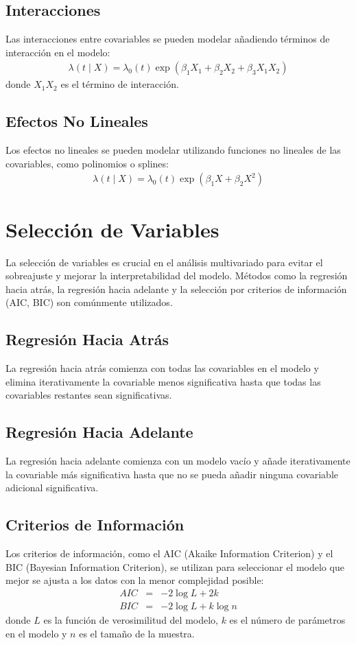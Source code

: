 \documentclass[a4paper]{report} %
\begin{document}
\subsection{Interacciones}
Las interacciones entre covariables se pueden modelar a\~nadiendo t\'erminos de interacci\'on en el modelo:
\begin{eqnarray*}
\lambda(t \mid X) = \lambda_0(t) \exp(\beta_1 X_1 + \beta_2 X_2 + \beta_3 X_1 X_2)
\end{eqnarray*}
donde $X_1 X_2$ es el t\'ermino de interacci\'on.

\subsection{Efectos No Lineales}
Los efectos no lineales se pueden modelar utilizando funciones no lineales de las covariables, como polinomios o splines:
\begin{eqnarray*}
\lambda(t \mid X) = \lambda_0(t) \exp(\beta_1 X + \beta_2 X^2)
\end{eqnarray*}

\section{Selecci\'on de Variables}
La selecci\'on de variables es crucial en el an\'alisis multivariado para evitar el sobreajuste y mejorar la interpretabilidad del modelo. M\'etodos como la regresi\'on hacia atr\'as, la regresi\'on hacia adelante y la selecci\'on por criterios de informaci\'on (AIC, BIC) son com\'unmente utilizados.

\subsection{Regresi\'on Hacia Atr\'as}
La regresi\'on hacia atr\'as comienza con todas las covariables en el modelo y elimina iterativamente la covariable menos significativa hasta que todas las covariables restantes sean significativas.

\subsection{Regresi\'on Hacia Adelante}
La regresi\'on hacia adelante comienza con un modelo vac\'io y a\~nade iterativamente la covariable m\'as significativa hasta que no se pueda a\~nadir ninguna covariable adicional significativa.

\subsection{Criterios de Informaci\'on}
Los criterios de informaci\'on, como el AIC (Akaike Information Criterion) y el BIC (Bayesian Information Criterion), se utilizan para seleccionar el modelo que mejor se ajusta a los datos con la menor complejidad posible:
\begin{eqnarray*}
AIC &=& -2 \log L + 2k \\
BIC &=& -2 \log L + k \log n
\end{eqnarray*}
donde $L$ es la funci\'on de verosimilitud del modelo, $k$ es el n\'umero de par\'ametros en el modelo y $n$ es el tama\~no de la muestra.
\end{document}

